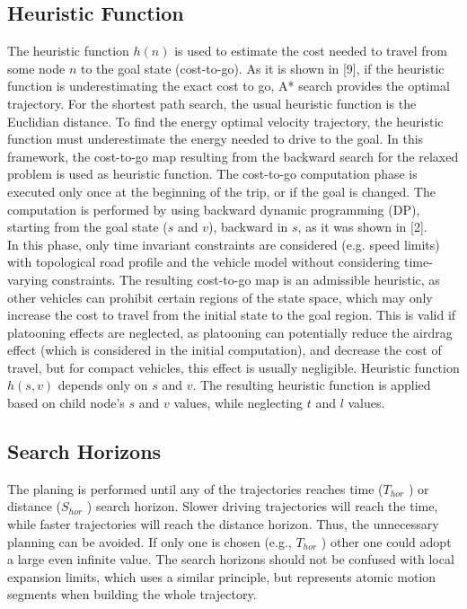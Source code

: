 \documentclass{report}
\begin{document}
\subsection{Heuristic Function}
The heuristic function $h(n)$ is used to estimate the cost needed to travel from some node $n$ to the goal state (cost-to-go). As it is shown in [9], if the heuristic function is underestimating the exact cost to go, A* search provides the optimal trajectory. For the shortest path search, the usual heuristic function is the Euclidian distance. To find the energy optimal velocity trajectory, the heuristic function must underestimate the energy needed to drive to the goal. In this framework, the cost-to-go map resulting from the backward search for the relaxed problem is used as heuristic function. The cost-to-go computation phase is executed only once at the beginning of the trip, or if the goal is changed. The computation is performed by using backward dynamic programming (DP), starting from the goal state ($s$ and $v$), backward in $s$, as it was shown in [2].\\
\indent
In this phase, only time invariant constraints are considered (e.g. speed limits) with topological road profile and the vehicle model without considering time-varying constraints. The resulting cost-to-go map is an admissible heuristic, as other vehicles can prohibit certain regions of the state space, which may only increase the cost to travel from the initial state to the goal region. This is valid if platooning effects are neglected, as platooning can potentially reduce the airdrag effect (which is considered in the initial computation), and decrease the cost of travel, but for compact vehicles, this effect is usually negligible. Heuristic function $h(s,v)$ depends only on $s$ and $v$. The resulting heuristic function is applied based on child node’s $s$ and $v$ values, while neglecting $t$ and $l$ values.

\subsection{Search Horizons}
The planing is performed until any of the trajectories reaches time ($T_{hor}$ ) or distance ($S_{hor}$ ) search horizon. Slower driving trajectories will reach the time, while faster trajectories will reach the distance horizon. Thus, the unnecessary planning can be avoided. If only one is chosen (e.g., $T_{hor}$ ) other one could adopt a large even infinite value. The search horizons should not be confused with local expansion limits, which uses a similar principle, but represents atomic motion segments when building the whole trajectory.
\end{document}
